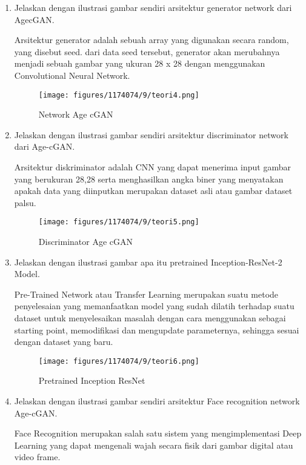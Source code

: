 \begin{enumerate}
        \item Jelaskan dengan ilustrasi gambar sendiri arsitektur generator network dari AgecGAN.

Arsitektur generator adalah sebuah array yang digunakan secara random, yang disebut seed. dari data seed tersebut, generator akan merubahnya menjadi sebuah gambar yang ukuran 28 x 28 dengan menggunakan Convolutional Neural Network.

	\begin{figure}[H]
		\texttt{[image: figures/1174074/9/teori4.png]}
            	\centering
           	\caption{Network Age cGAN}
       	 \end{figure}


        \item Jelaskan dengan ilustrasi gambar sendiri arsitektur discriminator network dari Age-cGAN.

Arsitektur diskriminator adalah CNN yang dapat menerima input gambar yang berukuran 28,28 serta menghasilkan angka biner yang menyatakan apakah data yang diinputkan merupakan dataset asli atau gambar dataset palsu.

	\begin{figure}[H]
		\texttt{[image: figures/1174074/9/teori5.png]}
            	\centering
           	\caption{Discriminator Age cGAN}
       	 \end{figure}


        \item Jelaskan dengan ilustrasi gambar apa itu pretrained Inception-ResNet-2 Model.

Pre-Trained Network atau Transfer Learning merupakan suatu metode penyelesaian yang memanfaatkan model yang sudah dilatih terhadap suatu dataset untuk menyelesaikan masalah dengan cara menggunakan sebagai starting point, memodifikasi dan mengupdate parameternya, sehingga sesuai dengan dataset yang baru.

	\begin{figure}[H]
		\texttt{[image: figures/1174074/9/teori6.png]}
            	\centering
           	\caption{Pretrained Inception ResNet}
       	 \end{figure}

        \item Jelaskan dengan ilustrasi gambar sendiri arsitektur Face recognition network Age-cGAN.

Face Recognition merupakan salah satu sistem yang mengimplementasi Deep Learning yang dapat mengenali wajah secara fisik dari gambar digital atau video frame.


\end{enumerate}
